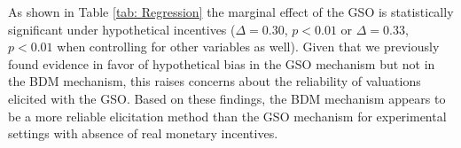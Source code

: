 \documentclass[12pt]{article}
\begin{document}
As shown in Table \ref{tab: Regression} the marginal effect of the GSO is statistically significant under hypothetical incentives  (\(\Delta = 0.30\), \(p < 0.01\) or \(\Delta = 0.33\), \(p < 0.01\) when controlling for other variables as well). Given that we previously found evidence in favor of hypothetical bias in the GSO mechanism but not in the BDM mechanism, this raises concerns about the reliability of valuations elicited with the GSO. Based on these findings, the BDM mechanism appears to be a more reliable elicitation method than the GSO mechanism for experimental settings with absence of real monetary incentives.

\vspace{0.5cm}



\end{document}
